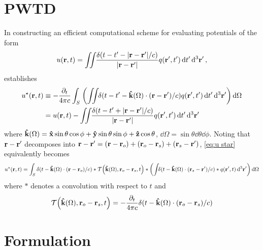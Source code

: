 \section{PWTD}

In constructing an efficient computational scheme for evaluating potentials of the form
\begin{equation}
  u(\vb{r}, t) = \iint_{} \kern0.1em \frac{\delta(t - t' - \abs{\vb{r} - \vb{r}'}/c)}{\abs{\vb{r} - \vb{r}'}} q(\vb{r}', t') \dd{t'} \dd[3]{\vb{r}'},
\end{equation}
\cite{PWTD} establishes 
\begin{align}
  u^\star(\vb{r}, t) &\equiv -\frac{\partial_t}{4 \pi c} \int_S \kern0.1em \qty( \iint_{} \kern0.1em \delta(t - t' - \vu{k}(\Omega) \cdot (\vb{r} - \vb{r}')/c) q(\vb{r}', t') \dd{t'} \dd[3]{\vb{r}'} ) \dd{\Omega} \label{eq:u star} \\
  &= u(\vb{r}, t) - \iint_{} \kern0.1em \frac{\delta(t - t' + \abs{\vb{r} - \vb{r}'}/c)}{\abs{\vb{r} - \vb{r}'}} q(\vb{r}', t') \dd{t'} \dd[3]{\vb{r}'}
\end{align}
where $\vu{k}(\Omega) = \vu{x} \sin\theta \cos\phi + \vu{y} \sin\theta \sin\phi + \vu{z}\cos\theta$, $\dd{\Omega} = \sin\theta \dd{\theta}\dd{\phi}$.
Noting that $\vb{r} - \vb{r}'$ decomposes into $\vb{r} - \vb{r}' = \qty(\vb{r} - \vb{r}_o) + \qty(\vb{r}_o - \vb{r}_s) + \qty(\vb{r}_s - \vb{r}')$, \cref{eq:u star} equivalently becomes
\begin{equation}
  u^\star(\vb{r}, t) = \int_S \delta(t - \vu{k}(\Omega) \cdot (\vb{r} - \vb{r}_o)/c) \ast \mathcal{T}\qty(\vu{k}(\Omega), \vb{r}_o - \vb{r}_s, t) \ast \qty(\int_{} \delta(t - \vu{k}(\Omega) \cdot \qty(\vb{r}_s - \vb{r}')/c) \ast q(\vb{r}', t) \dd[3]{\vb{r}'}) \dd{\Omega}
  \label{<+label+>}
\end{equation}
where $\ast$ denotes a convolution with respect to $t$ and
\begin{equation}
  \mathcal{T}\qty(\vu{k}(\Omega), \vb{r}_o - \vb{r}_s, t) = -\frac{\partial_t}{4\pi c} \delta(t - \vu{k}(\Omega) \cdot (\vb{r}_o - \vb{r}_s)/c)
  \label{eq:translation operator}
\end{equation}

\section{Formulation}

